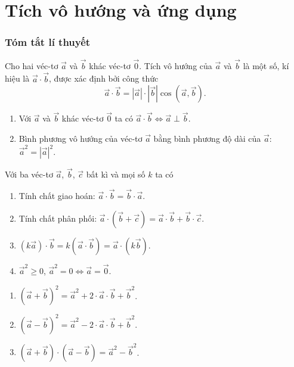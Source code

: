 \chapter{Tích vô hướng và ứng dụng}
\subsection{Tóm tắt lí thuyết}
\begin{dn}
	Cho hai véc-tơ $\vec{a}$ và $\vec{b}$ khác véc-tơ $\vec{0}$. Tích vô hướng của $\vec{a}$ và $\vec{b}$ là một số, kí hiệu là $\vec{a} \cdot\vec{b}$, được xác định bởi công thức
	$$\vec{a} \cdot\vec{b} = |\vec{a}  | \cdot |\vec{b}  | \cos \left( \vec{a}, \vec{b} \right).  $$
\end{dn}

\begin{tc}
	\begin{enumerate}
	\item Với $\vec{a}$ và $\vec{b}$ khác véc-tơ $\vec{0}$ ta có $\vec{a}\cdot \vec{b} \Leftrightarrow \vec{ a} \perp \vec{b}$.
	\item Bình phương vô hướng của véc-tơ $\vec{ a}$ bằng bình phương độ dài của $\vec{ a}$:
	$\vec{a} ^2 = | \vec{ a} | ^2 . $
	\end{enumerate}
\end{tc}

\begin{tc}
Với ba véc-tơ $\vec{a}$, $\vec{b}$, $\vec{c}$ bất kì và mọi số $k$ ta có
\begin{enumerate}
	\item Tính chất giao hoán: $\vec{a} \cdot\vec{b} = \vec{b} \cdot\vec{a}$.
		\item Tính chất phân phối: $\vec{a} \cdot \left( \vec{b} + \vec{c} \right)  = \vec{a} \cdot \vec{b} + \vec{b} \cdot \vec{c}$.
		\item $\left( k \vec{ a} \right) \cdot \vec{b} = k\left( \vec{a} \cdot\vec{b} \right) = \vec{ a} \cdot \left( k \vec{b} \right)  $.
		\item $\vec{a} ^2 \ge 0$, $\vec{a} ^2 = 0 \Leftrightarrow \vec{ a} = \vec{0}$. 
		\end{enumerate}
\end{tc}

\begin{tc}
	\begin{enumerate}
	\item $\left( \vec{ a} + \vec{b} \right)^2 = \vec{a} ^2 + 2 \cdot \vec{a} \cdot\vec{b} +   \vec{b} ^2$.
	\item $\left( \vec{ a} - \vec{b} \right)^2 = \vec{a} ^2 - 2 \cdot \vec{a} \cdot\vec{b} +   \vec{b} ^2$.
		\item $\left( \vec{ a} + \vec{b} \right) \cdot  \left( \vec{ a} - \vec{b} \right) = \vec{a} ^2  -  \vec{b} ^2$.
\end{enumerate}
\end{tc}

